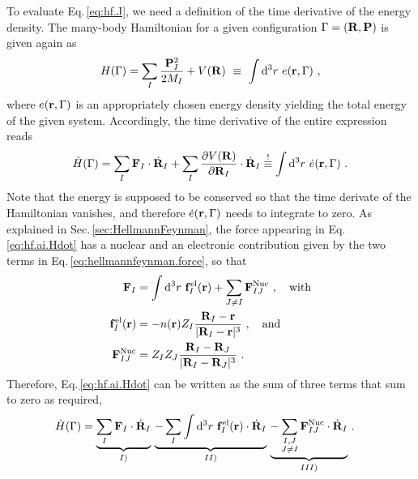 To evaluate Eq.\,\eqref{eq:hf.J}, we need a definition of the time derivative of the energy density. The many-body Hamiltonian for a given configuration $\Gamma = ({\bf R}, {\bf P})$ is given again as
\begin{align}
	H (\Gamma) = \sum_I \frac{\b P_I^2}{2 M_I} + V(\b R) 
		~\equiv~ \int \d^3 r ~ e (\b r, \Gamma)~,
  \label{eq:hf.ai.H}
\end{align}
where $e ({\bf r}, \Gamma)$ is an appropriately chosen energy density yielding the total energy of the given system. Accordingly, the time derivative of the entire expression reads
\begin{align}
	\dot{H} (\Gamma)
		= \sum_I \b F_I \cdot \dot{\b R}_I 
		+ \sum_I \frac{\partial V(\b R)}{\partial \b R_I} \cdot \dot{\b R}_I
			\label{eq:hf.ai.Hdot}
		\stackrel{!}{\equiv}
			\int \d^3 r ~ \dot{e} (\b r , \Gamma)~.
\end{align}
Note that the energy is supposed to be conserved so that the time derivate of the Hamiltonian vanishes, and therefore $\dot{e} ({\bf r}, \Gamma)$ needs to integrate to zero.
As explained in Sec.\,\ref{sec:HellmannFeynman}, the force appearing in Eq.\,\eqref{eq:hf.ai.Hdot} has a nuclear and an electronic contribution given by the two terms in Eq.\,\eqref{eq:hellmannfeynman.force}, so that
\begin{align}
	\b F_I
		&%
			= \int \d^3 r ~ \b f_I^{\rm el} (\b r) + \sum_{J \neq I} \b F_{IJ}^{\rm Nuc}~, \quad\text{with}
		\label{eq:hf.ai.F}\\
	\b f_I^{\rm el} (\b r)
		&= - n(\b r) Z_I \frac{\b R_I - \b r}{\lvert \b R_I - \b r \rvert^3}~, \quad\text{and} \\
	\b F_{IJ}^{\rm Nuc}
		&= Z_I Z_J \frac{\b R_I - \b R_J}{\lvert \b R_I - \b R_J \rvert^3}~.
\end{align}
Therefore, Eq.\,\eqref{eq:hf.ai.Hdot} can be written as the sum of three terms that sum to zero as required,
\begin{align}
	\dot{H} (\Gamma)
		&= \underset{I)}{\underbrace{\sum_I {\bf F}_I \cdot \dot{{\bf R}}_I}} ~ 
			 \underset{II)}{\underbrace{-\sum_{I} \int {\rm d}^3 r ~ {\bf f}_I^{\rm el} ({\bf r}) \cdot \dot{{\bf R}}_I}} ~
			 \underset{III)}{\underbrace{-\sum_{\substack{I, J \\ J \neq I}} {\bf F}^{\rm Nuc}_{IJ} \cdot \dot{{\bf R}}_I}}~.
\end{align}
